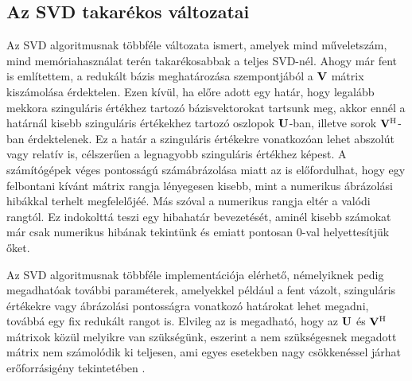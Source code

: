         \subsection{Az SVD takarékos változatai}
            Az SVD algoritmusnak többféle változata ismert, amelyek mind műveletszám, mind memóriahasználat terén takarékosabbak a teljes SVD-nél. Ahogy már fent is említettem, a redukált bázis meghatározása szempontjából a ${\bf V}$ mátrix kiszámolása érdektelen. Ezen kívül, ha előre adott egy határ, hogy legalább mekkora szinguláris értékhez tartozó bázisvektorokat tartsunk meg, akkor ennél a határnál kisebb szinguláris értékekhez tartozó oszlopok ${\bf U}$-ban, illetve sorok ${\bf V}^{\mathrm{H}}$-ban érdektelenek. Ez a határ a szinguláris értékekre vonatkozóan lehet abszolút vagy relatív is, célszerűen a legnagyobb szinguláris értékhez képest. A számítógépek véges pontosságú számábrázolása miatt az is előfordulhat, hogy egy felbontani kívánt mátrix rangja lényegesen kisebb, mint a numerikus ábrázolási hibákkal terhelt megfelelőjéé. Más szóval a numerikus rangja eltér a valódi rangtól. Ez indokolttá teszi egy hibahatár bevezetését, aminél kisebb számokat már csak numerikus hibának tekintünk és emiatt pontosan 0-val helyettesítjük őket.
            \par
            Az SVD algoritmusnak többféle implementációja elérhető, némelyiknek pedig megadhatóak további paraméterek, amelyekkel például a fent vázolt, szinguláris értékekre vagy ábrázolási pontosságra vonatkozó határokat lehet megadni, továbbá egy fix redukált rangot is. Elvileg az is megadható, hogy az ${\bf U}$ és ${\bf V^{\mathrm{H}}}$ mátrixok közül melyikre van szükségünk, eszerint a nem szükségesnek megadott mátrix nem számolódik ki teljesen, ami egyes esetekben nagy csökkenéssel járhat erőforrásigény tekintetében \cite{Golub70}.
            \par
